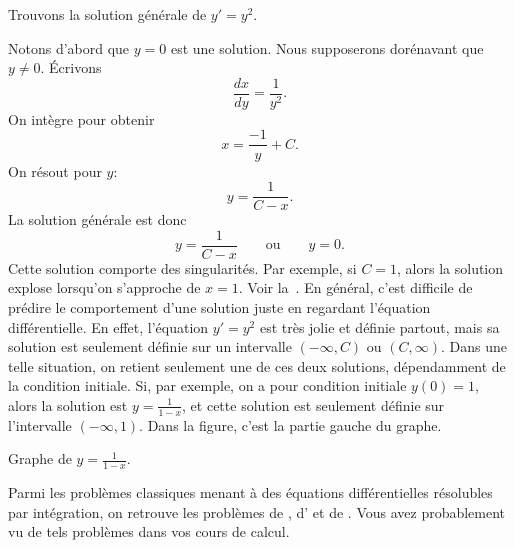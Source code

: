 \begin{example}
	Trouvons la solution générale de $y' = y^2$.

	Notons d'abord que $y=0$ est une solution.  Nous supposerons dorénavant que $y \not= 0$.
	Écrivons
	\begin{equation*}
		\frac{dx}{dy} = \frac{1}{y^2} .
	\end{equation*}
	On intègre pour obtenir
	\begin{equation*}
		x = \frac{-1}{y} + C .
	\end{equation*}
	On résout pour $y$:
	\begin{equation*}
		y = \frac{1}{C-x}.
	\end{equation*}
	La solution générale est donc
	\begin{equation*}
		y = \frac{1}{C-x} \qquad \text{ou} \qquad y = 0.
	\end{equation*}
	Cette solution comporte des singularités.
	Par exemple, si $C=1$, alors la solution \og{}explose\fg{} lorsqu'on s'approche de $x=1$.
	Voir la~.
	En général, c'est difficile de prédire le comportement d'une solution juste en regardant l'équation différentielle.
	En effet, l'équation $y' = y^2$ est très jolie et définie partout, mais sa solution est seulement définie sur un intervalle $(-\infty, C)$ ou
	$(C, \infty)$.  Dans une telle situation, on retient seulement une de ces deux solutions, dépendamment de la condition initiale.
	Si, par exemple, on a pour condition initiale $y(0) = 1$, alors la solution est $y=\frac{1}{1-x}$,
	et cette solution est seulement définie sur l'intervalle  $(-\infty,1)$.
	Dans la figure, c'est la partie gauche du graphe.

	\begin{myfig}
		\capstart
		\caption{Graphe de $y=\frac{1}{1-x}$.\label{1over1mx:fig}}
	\end{myfig}
\end{example}

Parmi les problèmes classiques menant à des équations différentielles résolubles par intégration,
on retrouve les problèmes de ,
d' et de  .
Vous avez probablement vu de tels problèmes dans vos cours de calcul.

